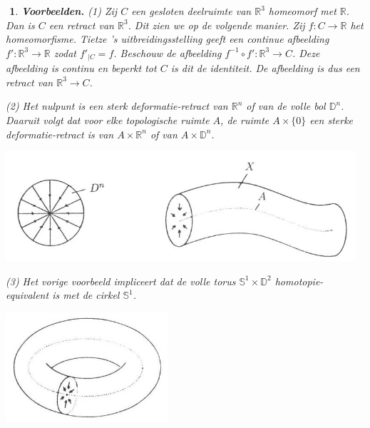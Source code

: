 \documentclass[12pt]{book}
\newcommand{\R}{\mathbb{R}}
\newtheorem{vbnh}[stelh]{$\!\!$}
\newenvironment{vbn}{\begin{vbnh} \em {\bf Voorbeelden.}}{\end{vbnh}}
\begin{document}
\begin{vbn}
(1) Zij $C$ een gesloten deelruimte van $\R^3$ homeomorf met $\R$. Dan is $C$ een retract van $\R^3$. Dit zien we op de volgende manier. Zij $f:C\to \R$ het homeomorfisme. Tietze 's uitbreidingsstelling geeft een continue afbeelding $f':\R^3\to \R$ zodat $f'_{|C}=f$. Beschouw de afbeelding
$f^{-1}\circ f':\R^3\to C$. Deze afbeelding is continu en beperkt tot $C$ is dit de identiteit. De afbeelding is dus een retract van $\R^3\to C$. 

\bigskip
(2) Het nulpunt is een sterk deformatie-retract van $\R^n$ of van de volle bol $\mathbb{D}^n$. Daaruit volgt dat voor elke topologische ruimte $A$, de ruimte $A\times \{0\}$
een sterke deformatie-retract is van $A\times \R^n$ of van $A\times \mathbb{D}^{n}$.

\begin{center}
\includegraphics[width=13cm]{images/diskstr.jpg}
\end{center}



(3) Het vorige voorbeeld impliceert dat de volle torus $\mathbb{S}^{1}\times \mathbb{D}^{2}$ homotopie-equivalent is met de cirkel $\mathbb{S}^{1}$.

\begin{center}
\includegraphics[width=6cm]{images/voltorus.jpg}
\end{center}



\end{vbn}
\end{document}
